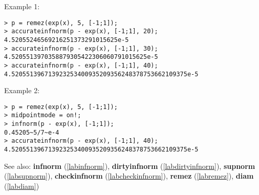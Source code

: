 \noindent Example 1: 
\begin{center}\begin{minipage}{15cm}\begin{Verbatim}[frame=single]
> p = remez(exp(x), 5, [-1;1]);
> accurateinfnorm(p - exp(x), [-1;1], 20);
4.52055246569216251373291015625e-5
> accurateinfnorm(p - exp(x), [-1;1], 30);
4.5205513970358879305422306060791015625e-5
> accurateinfnorm(p - exp(x), [-1;1], 40);
4.520551396713923253400935209356248378753662109375e-5
\end{Verbatim}
\end{minipage}\end{center}
\noindent Example 2: 
\begin{center}\begin{minipage}{15cm}\begin{Verbatim}[frame=single]
> p = remez(exp(x), 5, [-1;1]);
> midpointmode = on!;
> infnorm(p - exp(x), [-1;1]);
0.45205~5/7~e-4
> accurateinfnorm(p - exp(x), [-1;1], 40);
4.520551396713923253400935209356248378753662109375e-5
\end{Verbatim}
\end{minipage}\end{center}
See also: \textbf{infnorm} (\ref{labinfnorm}), \textbf{dirtyinfnorm} (\ref{labdirtyinfnorm}), \textbf{supnorm} (\ref{labsupnorm}), \textbf{checkinfnorm} (\ref{labcheckinfnorm}), \textbf{remez} (\ref{labremez}), \textbf{diam} (\ref{labdiam})
